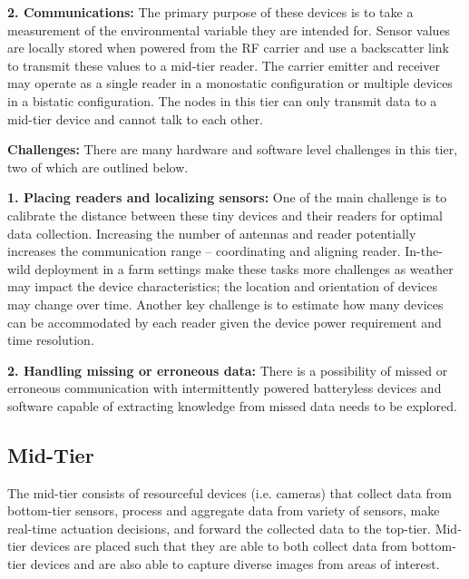 \noindent\textbf{2. Communications:} 
The primary purpose of these devices is to take a measurement of the environmental variable they are intended for. Sensor values are locally stored when powered from the RF carrier and use a backscatter link to transmit these values to a mid-tier reader. The carrier emitter and receiver may operate as a single reader in a monostatic configuration or multiple devices in a bistatic configuration. The nodes in this tier can only transmit data to a mid-tier device and cannot talk to each other. %

\noindent\textbf{Challenges:} There are many hardware and software level challenges in this tier, two of which are outlined below. 

\noindent\textbf{1. Placing readers and localizing sensors:}
One of the main challenge is to calibrate the distance between these tiny devices and their readers for optimal data collection. Increasing the number of antennas and reader potentially increases the communication range -- coordinating and aligning reader. In-the-wild deployment in a farm settings make these tasks more challenges as weather may impact the device characteristics; the location and orientation of devices may change over time. 
Another key challenge is to estimate how many devices can be accommodated by each reader given the device power requirement and time resolution.   

\noindent\textbf{2. Handling missing or erroneous data:}
 There is a possibility of missed or erroneous communication with intermittently powered batteryless devices and software capable of extracting knowledge from missed data needs to be explored. 


\subsection{Mid-Tier} 
The mid-tier consists of resourceful devices (i.e. cameras) that collect data from bottom-tier sensors, process and aggregate data from variety of sensors, make real-time actuation decisions, and forward the collected data to the top-tier. Mid-tier devices are placed such that they are able to both collect data from bottom-tier devices and are also able to capture diverse images from areas of interest.


